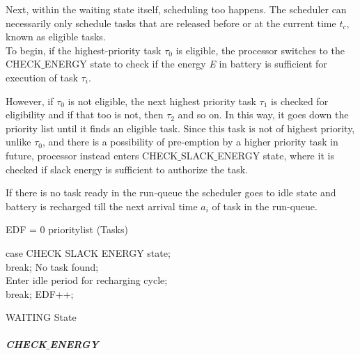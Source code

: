 \documentclass[12pt,hidelinks]{article}
\begin{document}
{Next, within the waiting state itself, scheduling too happens. The scheduler can necessarily only schedule tasks that are released before or at the current time \textit{$t_c$}, known as eligible tasks.\\

To begin, if the highest-priority task {$\tau_0$} is eligible, the processor switches to the CHECK$\_$ENERGY state to check if the energy \textit{E} in battery is sufficient for execution of task $\tau_i$\newline.

However, if {$\tau_0$} is not eligible, the next highest priority task {$\tau_1$} is checked for eligibility and if that too is not, then {$\tau_2$} and so on. In this way, it goes down the priority list until it finds an eligible task. Since this task is not of highest priority, unlike {$\tau_0$}, and there is a possibility of pre-emption by a higher priority task in future, processor instead enters CHECK$\_$SLACK$\_$ENERGY state, where it is checked if slack energy is sufficient to authorize the task.\newline

If there is no task ready in the run-queue the scheduler goes to idle state and battery is recharged till the next arrival time {$a_i$} of task in the run-queue.

\begin{algorithm}[H]
\DontPrintSemicolon
  EDF = 0 
   prioritylist \gets {}(Tasks)
  
  
  \Else 
         {    
        {
        	{case CHECK SLACK ENERGY state;\\
        	break;}
        	{No task found;\\
        	Enter idle period for recharging cycle;\\
        	break;}
        	EDF++;\\
        }
    }
\caption{WAITING State}
\end{algorithm}

\newline
\subparagraph{CHECK$\_$ENERGY}\hfill
\newline

}
\end{document}
